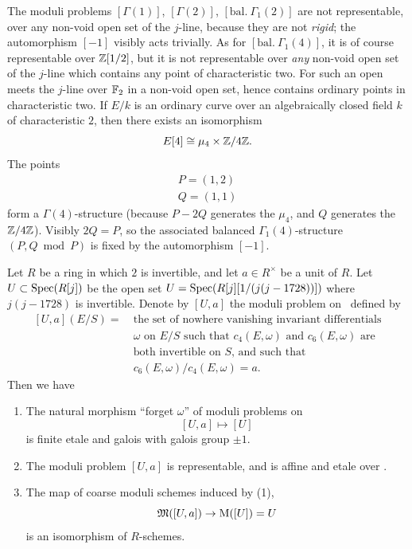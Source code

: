 \begin{krem}\label{rem:8.4.8}
The moduli problems $[\Gamma(1)]$, $[\Gamma(2)]$, $[\mathrm{bal.}\ \Gamma_1(2)]$ are not representable, over any non-void open set of the $j$-line, because they are not \emph{rigid}; the automorphism $[-1]$ visibly acts trivially. As for $[\mathrm{bal.}\ \Gamma_1(4)]$, it is of course representable over $\mathbb{Z}[1/2]$, but it is not representable over \emph{any} non-void open set of the $j$-line which contains any point of characteristic two. For such an open meets the $j$-line over $\mathbb{F}_2$ in a non-void open set, hence contains ordinary points in characteristic two. If $E/k$ is an ordinary curve over an algebraically closed field $k$ of characteristic $2$, then there exists an isomorphism
\[
E[4] \cong \mu_4 \times \mathbb{Z}/4\mathbb{Z} .
\]
The points
\begin{gather*}
P = (1,2) \\
Q = (1,1)
\end{gather*}
form a $\Gamma(4)$-structure (because $P - 2Q$ generates the $\mu_4$, and $Q$ generates the $\mathbb{Z}/4\mathbb{Z}$). Visibly $2Q = P$, so the associated balanced $\Gamma_1(4)$-structure $(P, Q \bmod P)$ is fixed by the automorphism $[-1]$.
\end{krem}

\begin{kthm}\label{thm:8.4.9}
Let $R$ be a ring in which $2$ is invertible, and let $a \in R^\times$ be a unit of $R$. Let $U \subset \operatorname{Spec}(R[j])$ be the open set $U = \operatorname{Spec}(R[j][1/(j(j-1728))])$ where $j(j-1728)$ is invertible. Denote by $[U, a]$ the moduli problem on \EllR\ defined by
\[
\begin{aligned}
[U, a](E/S) =\ &\text{the set of nowhere vanishing invariant differentials} \\
&\text{$\omega$ on $E/S$ such that $c_4(E, \omega)$ and $c_6(E, \omega)$ are} \\
&\text{both invertible on $S$, and such that} \\[3pt]
&c_6(E, \omega)/c_4(E, \omega) = a .
\end{aligned}
\]
Then we have
\begin{enumerate}[(1)]
\item The natural morphism ``forget $\omega$'' of moduli problems on \EllR
\[
[U, a] \mapsto [U]
\]
is finite etale and galois with galois group $\pm 1$.
\item The moduli problem $[U, a]$ is representable, and is affine and etale over \EllR.
\item The map of coarse moduli schemes induced by (1),
\[
\mathfrak{M}([U, a]) \to \mathrm{M}([U]) = U
\]
is an isomorphism of $R$-schemes.
\end{enumerate}
\end{kthm}

